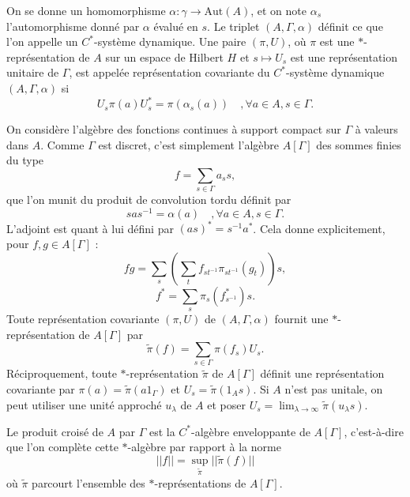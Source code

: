 On se donne un homomorphisme $\alpha : \gamma \rightarrow \text{Aut}(A)$, et on note $\alpha_s$ l'automorphisme donné par $\alpha$ évalué en $s$. Le triplet $(A,\Gamma, \alpha)$ définit ce que l'on appelle un $C^*$-système dynamique. Une paire $(\pi, U)$, où $\pi $ est une $*$-représentation de $A$ sur un espace de Hilbert $H$ et $s\mapsto U_s$ est une représentation unitaire de $\Gamma$, est appelée représentation covariante du $C^*$-système dynamique $(A,\Gamma,\alpha)$ si 
\[U_s \pi(a) U_s^* = \pi(\alpha_s(a))\quad,\forall a\in A, s\in \Gamma.\]

On considère l'algèbre des fonctions continues à support compact sur $\Gamma$ à valeurs dans $A$. Comme $\Gamma$ est discret, c'est simplement l'algèbre $A[\Gamma]$ des sommes finies du type 
\[f=\sum_ {s\in \Gamma} a_s s,\]
que l'on munit du produit de convolution tordu définit par 
\[s a s^{-1} = \alpha(a) \quad,\forall a\in A, s\in \Gamma.\]
L'adjoint est quant à lui défini par $(as)^*=s^{-1} a^*$. Cela donne explicitement, pour $f,g\in A[\Gamma]$ :
\[fg= \sum_s \left(\sum_t f_{st^{-1}}\pi_{st^{-1}}(g_t)\right)s,\]
\[f^*= \sum_s \pi_s(f^*_{s^{-1}})s.\] 
Toute représentation covariante $(\pi,U)$ de $(A,\Gamma,\alpha)$ fournit une $*$-représentation de $A[\Gamma]$ par 
\[\tilde\pi (f)=\sum_{s\in\Gamma} \pi(f_s)U_s.\]
Réciproquement, toute $*$-représentation $\tilde \pi$ de $A[\Gamma]$ définit une représentation covariante par $\pi(a)=\tilde\pi(a1_\Gamma)$ et $U_s=\tilde\pi(1_A s)$. Si $A$ n'est pas unitale, on peut utiliser une unité approché $u_\lambda$ de $A$ et poser $U_s=\lim_{\lambda \rightarrow \infty}\tilde\pi (u_\lambda s)$.\\

\begin{definition} Le produit croisé de $A$ par $\Gamma$ est la $C^*$-algèbre enveloppante de $A[\Gamma]$, c'est-à-dire que l'on complète cette $*$-algèbre par rapport à la norme 
\[||f|| = \sup_{\tilde\pi} ||\tilde \pi (f)||\]
où $\tilde \pi$ parcourt l'ensemble des $*$-représentations de $A[\Gamma]$. 
\end{definition}

